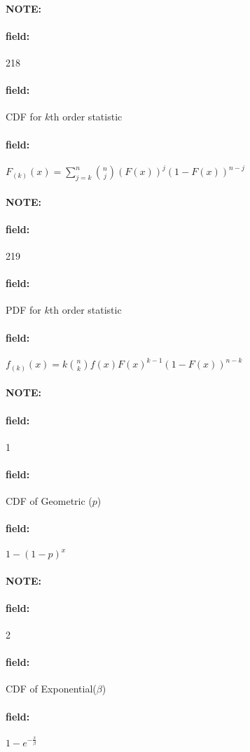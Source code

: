 \documentclass[12pt]{article}
\newenvironment{note}{\paragraph{NOTE:}}{}
\newenvironment{field}{\paragraph{field:}}{}
\begin{document}
\begin{note} \begin{field} \tiny 218 \end{field}
  \begin{field}
    CDF for $k$th order statistic
  \end{field}
  \begin{field}
    $F_{(k)}(x) = \sum_{j = k}^n \binom{n}{j}(F(x))^j(1 -F(x))^{n-j}$
  \end{field}
\end{note}

\begin{note} \begin{field} \tiny 219 \end{field}
  \begin{field}
    PDF for $k$th order statistic
  \end{field}
  \begin{field}
    $f_{(k)}(x) = k \binom{n}{k}f(x)F(x)^{k-1}(1 - F(x))^{n-k}$
  \end{field}
\end{note}


\begin{note}
  \begin{field}
    \tiny 1
  \end{field}
  \begin{field}
    CDF of Geometric ($p$)
  \end{field}
  \begin{field}
    $1 - (1-p)^x$
  \end{field}
\end{note}


\begin{note}
  \begin{field}
    \tiny 2
  \end{field}
  \begin{field}
    CDF of Exponential($\beta$)
  \end{field}
  \begin{field}
    $1 - e^{-\frac{x}{\beta}}$
  \end{field}
\end{note}
\end{document}

